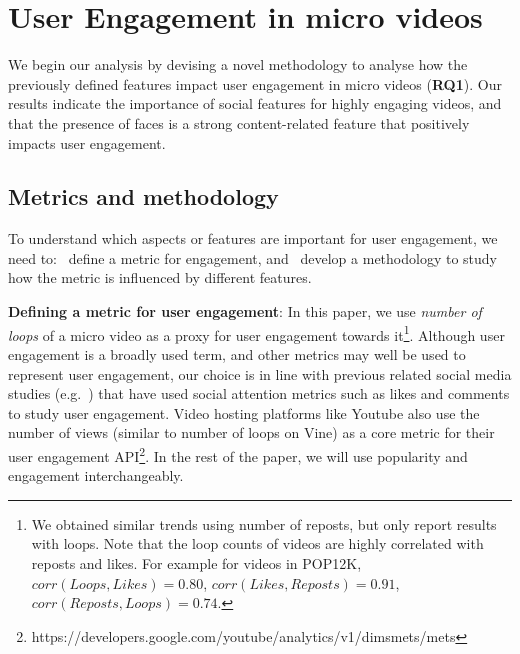 \section{User Engagement in micro videos}
\label{sec:classifier}
We begin our analysis by devising a novel 
methodology to analyse how the previously defined features impact user engagement in micro videos (\textbf{RQ1}). Our results indicate the importance of social features for highly engaging videos, and that the presence of faces is a strong content-related feature that positively impacts user engagement.

\subsection{Metrics and methodology}
\label{sec:methodology}
To understand which aspects or features are important for user engagement, we need to: \one\ define a metric for engagement, and \two\ develop a methodology to study how the metric is influenced by different features. 

\noindent\textbf{Defining a metric for user engagement}:  In this paper, we  use \emph{number of loops} of a micro video as a proxy for user engagement towards it\footnote{We obtained similar trends using number of reposts, but only report results with loops. Note that the loop counts of videos are highly correlated with reposts and likes. For example for videos in POP12K, $ corr(Loops,Likes) = 0.80$, $corr(Likes,Reposts) = 0.91$, $corr(Reposts,Loops) = 0.74$.}.
Although user engagement is a broadly used term, and other metrics may well be used to represent user engagement, our choice is in line with previous related social media studies (e.g.~\cite{bakhshi2014faces})  that have used social attention metrics such as likes and comments to study user engagement. Video hosting platforms like Youtube also use the number of views (similar to number of loops on Vine) as a core metric for their user engagement API\footnote{\scriptsize https://developers.google.com/youtube/analytics/v1/dimsmets/mets}. In the rest of the paper, we will use popularity and engagement interchangeably.


